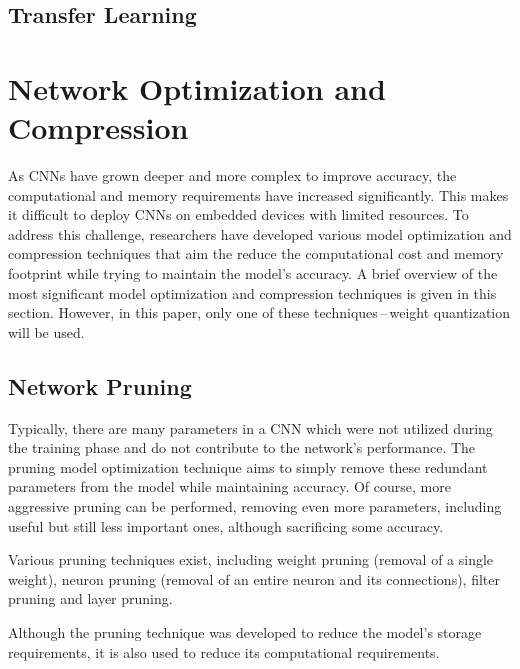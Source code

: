 

\subsection{Transfer Learning}





\section{Network Optimization and Compression}

As CNNs have grown deeper and more complex to improve accuracy, the
computational and memory requirements have increased significantly. This makes
it difficult to deploy CNNs on embedded devices with limited resources. To
address this challenge, researchers have developed various model optimization
and compression techniques that aim the reduce the computational cost and memory
footprint while trying to maintain the model's accuracy. A brief overview of the
most significant model optimization and compression techniques is given in this
section. However, in this paper, only one of these techniques\,--\,weight
quantization will be used.


\subsection{Network Pruning}

Typically, there are many parameters in a CNN which were not utilized during the
training phase and do not contribute to the network's performance. The pruning
model optimization technique aims to simply remove these redundant parameters
from the model while maintaining accuracy. Of course, more aggressive pruning
can be performed, removing even more parameters, including useful but still less
important ones, although sacrificing some accuracy.

Various pruning techniques exist, including weight pruning (removal of a single
weight), neuron pruning (removal of an entire neuron and its connections),
filter pruning and layer pruning.

Although the pruning technique was developed to reduce the model's storage
requirements, it is also used to reduce its computational requirements.



